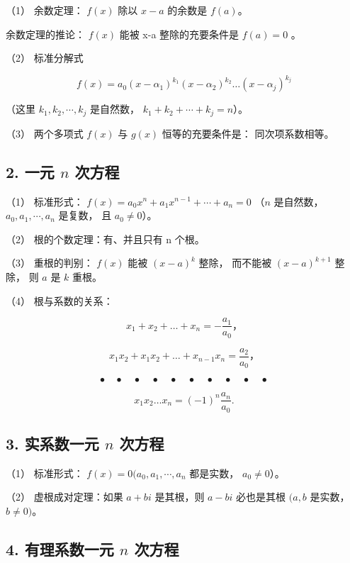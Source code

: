 （1） 余数定理： \(f(x)\) 除以 \(x - a\) 的余数是 \(f(a)\)。

余数定理的推论： \(f(x)\) 能被 x-a 整除的充要条件是 \(f(a)=0\) 。

（2） 标准分解式

\[
f (x) = a _ {0} \left(x - \alpha_ {1}\right) ^ {k _ {1}} \left(x - \alpha_ {2}\right) ^ {k _ {2}} \dots \left(x - \alpha_ {j}\right) ^ {k _ {j}}
\]

（这里 \(k_{1}, k_{2}, \cdots, k_{j}\) 是自然数，
\(k_{1} + k_{2} + \cdots + k_{j} = n\)）。

（3） 两个多项式 \(f(x)\) 与 \(g(x)\) 恒等的充要条件是：
同次项系数相等。

\subsection{\texorpdfstring{2. 一元 \(n\) 次方程}{2. 一元 n 次方程}}

（1） 标准形式： \(f(x) = a_0 x^n + a_1 x^{n-1} + \cdots + a_n = 0\)
（\(n\) 是自然数， \(a_0, a_1, \cdots, a_n\) 是复数， 且
\(a_0 \neq 0\)）。

（2） 根的个数定理：有、并且只有 n 个根。

（3） 重根的判别： \(f(x)\) 能被 \((x - a)^{k}\) 整除， 而不能被
\((x - a)^{k+1}\) 整除， 则 \(a\) 是 \(k\) 重根。

（4） 根与系数的关系：

\[
x _ {1} + x _ {2} + \dots + x _ {n} = - \frac {a _ {1}}{a _ {0}}\text{，}
\]

\[
x _ {1} x _ {2} + x _ {1} x _ {2} + \dots + x _ {n - 1} x _ {n} = \frac {a _ {2}}{a _ {0}}\text{，}
\]

\[
\bullet \quad \bullet \quad \bullet \quad \bullet \quad \bullet \quad \bullet \quad \bullet \quad \bullet \quad \bullet \quad \bullet \tag {1.1}
\]

\[
x _ {1} x _ {2} \dots x _ {n} = (- 1) ^ {n} \frac {a _ {n}}{a _ {0}}.
\]

\subsection{\texorpdfstring{3. 实系数一元 \(n\) 次方程}{3. 实系数一元 n 次方程}}

（1） 标准形式： \(f(x) = 0 (a_0, a_1, \cdots, a_n\) 都是实数，
\(a_0 \neq 0\)）。

（2） 虚根成对定理：如果 \(a + bi\) 是其根，则 \(a - bi\) 必也是其根
\((a, b\) 是实数，\(b \neq 0)\)。

\subsection{\texorpdfstring{4. 有理系数一元 \(n\) 次方程}{4. 有理系数一元 n 次方程}}

